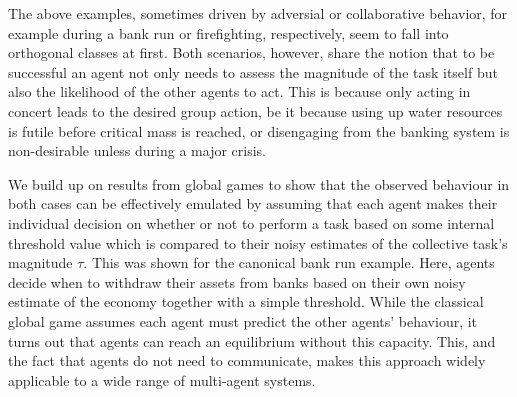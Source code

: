 \documentclass{nature}
\begin{document}
The above examples, sometimes driven by adversial or collaborative behavior, for example during a bank run or firefighting, respectively, seem to fall into orthogonal classes at first. 
Both scenarios, however, share the notion that to be successful an agent not only needs to assess the magnitude of the task itself but also the likelihood of the other agents to act. This is because only acting in concert leads to the desired group action, be it because using up water resources is futile before critical mass is reached, or disengaging from the banking system is non-desirable unless during a major crisis. 

 We build up on results from global games\cite{Carlsson1993} to show that the observed behaviour in both cases can be effectively emulated by assuming that each agent makes their individual decision on whether or not to perform a task based on some internal threshold value which is compared to their noisy estimates of the collective task's magnitude $\tau$. This was shown for the canonical bank run example\cite{Morris2000}. Here, agents decide when to withdraw their assets from banks based on their own noisy estimate of the economy together with a simple threshold.  While the classical global game assumes each agent must predict the other agents' behaviour, it turns out that agents can reach an equilibrium without this capacity. This, and the fact that agents do not need to communicate, makes this approach widely applicable to a wide range of multi-agent systems.
\end{document}
